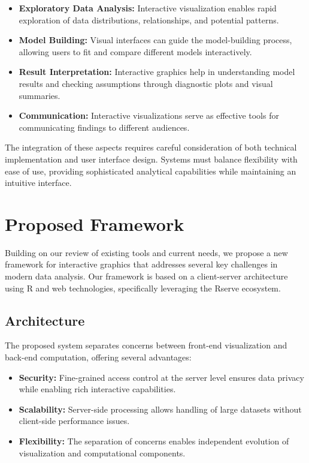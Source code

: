 \documentclass{article}
\begin{document}
\begin{itemize}
\item \textbf{Exploratory Data Analysis:} Interactive visualization enables rapid exploration of data distributions, relationships, and potential patterns.

\item \textbf{Model Building:} Visual interfaces can guide the model-building process, allowing users to fit and compare different models interactively.

\item \textbf{Result Interpretation:} Interactive graphics help in understanding model results and checking assumptions through diagnostic plots and visual summaries.

\item \textbf{Communication:} Interactive visualizations serve as effective tools for communicating findings to different audiences.
\end{itemize}

The integration of these aspects requires careful consideration of both technical implementation and user interface design. Systems must balance flexibility with ease of use, providing sophisticated analytical capabilities while maintaining an intuitive interface.

\section{Proposed Framework}
\label{sec:framework}

Building on our review of existing tools and current needs, we propose a new framework for interactive graphics that addresses several key challenges in modern data analysis. Our framework is based on a client-server architecture using R and web technologies, specifically leveraging the Rserve ecosystem.

\subsection{Architecture}
The proposed system separates concerns between front-end visualization and back-end computation, offering several advantages:

\begin{itemize}
\item \textbf{Security:} Fine-grained access control at the server level ensures data privacy while enabling rich interactive capabilities.

\item \textbf{Scalability:} Server-side processing allows handling of large datasets without client-side performance issues.

\item \textbf{Flexibility:} The separation of concerns enables independent evolution of visualization and computational components.
\end{itemize}
\end{document}
